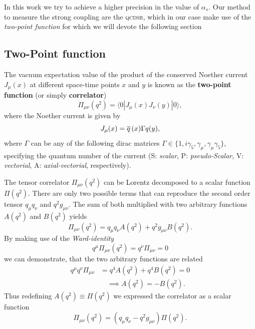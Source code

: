 \documentclass[../../index.tex]{subfiles}
\begin{document}
In this work we try to achieve a higher precision in the value of $\alpha_s$.
Our method to measure the strong coupling are the \textsc{qcdsr},
which in our case make use of the \textit{two-point function} for
which we will devote the following section
\subsection{Two-Point function}
\label{sec:twoPointFunction}
The vacuum expectation value of the product of the conserved Noether current
$J_\mu(x)$ at different space-time points $x$ and $y$ is known as the
\textbf{two-point function} (or simply \textbf{correlator})
\begin{equation}
  \label{eq:twoPointFunction}
  \Pi_{\mu\nu}(q^2) = \langle  0 | J_\mu(x) J_\nu(y) | 0 \rangle,
\end{equation}
where the Noether current is given by
\begin{equation}
  \label{eq:qcdCurrent}
  J_\mu(x) = \overline{q}\,(x) \Gamma q(y),
\end{equation}
where $\Gamma$ can be any of the following dirac matrices $\Gamma \in \{ 1,
i\gamma_5, \gamma_\mu, \gamma_\mu\gamma_5\}$, specifying the quantum number of
the current (S: \textit{scalar}, P: \textit{pseudo-Scalar}, V:
\textit{vectorial}, A: \textit{axial-vectorial}, respectively).

The tensor correlator $\Pi_{\mu\nu}(q^2)$ can be Lorentz decomposed to a scalar
function $\Pi(q^2)$. There are only two possible terms that can reproduce the
second order tensor $q_\mu q_\nu$ and $q^2 g_{\mu\nu}$. The sum of both
multiplied with two arbitrary functions $A(q^2)$ and $B(q^2)$ yields
\begin{equation}
  \Pi_{\mu\nu}(q^2) = q_\mu q_\nu A(q^2) + q^2 g_{\mu\nu} B(q^2).
\end{equation}
By making use of the \textit{Ward-identity} \cite{Peskin1995}
\begin{equation}
  \label{eq:wardIdentity}
  q^\mu \Pi_{\mu\nu}(q^2) = q^\nu \Pi_{\mu\nu} = 0
\end{equation}
we can demonstrate, that the two arbitrary functions are related
\begin{equation}
  \begin{split}
    q^\mu q^\nu \Pi_{\mu\nu} &= q^4 A(q^2) + q^4 B(q^2) = 0 \\
    &\quad \implies A(q^2) = -B(q^2).
  \end{split}
\end{equation}
Thus redefining $A(q^2) \equiv \Pi(q^2)$ we expressed the correlator as a scalar
function
\begin{equation}
  \Pi_{\mu\nu}(q^2) = (q_\mu q_\nu - q^2 g_{\mu\nu})\Pi(q^2).
\end{equation}
\end{document}
